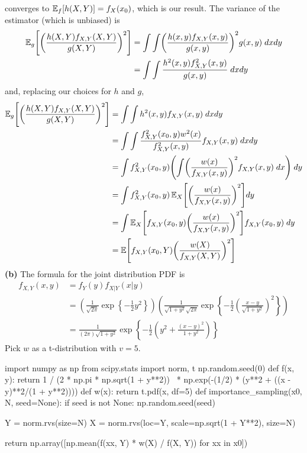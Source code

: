 converges to \(\operatorname{\mathbb{E}}_f[h(X, Y)] = f_X(x_{0})\), which is our result.
The variance of the estimator (which is unbiased) is
\begin{align*}
\EXP_g\left[ \left(\frac{h(X, Y) f_{X, Y}(X, Y)}{g(X, Y)} \right)^{2} \right]
&= \int \int \left( \frac{h(x, y) f_{X, Y}(x, y)}{g(x, y)} \right)^{2} g(x, y) \; dx dy \\
&= \int \int \frac{h^{2}(x, y) f_{X, Y}^{2}(x, y)}{g(x, y)} \; dx dy
\end{align*}
and, replacing our choices for \(h\) and \(g\),
\begin{align*}
\EXP_g\left[ \left(\frac{h(X, Y) f_{X, Y}(X, Y)}{g(X, Y)} \right)^{2} \right]
&= \int \int h^{2}(x, y) f_{X, Y}(x, y) \; dx dy \\
&= \int \int \frac{f_{X, Y}^{2}(x_{0}, y) w^{2}(x) }{ f_{X, Y}^{2}(x, y) } f_{X, Y}(x, y) \; dx dy \\
&= \int f_{X, Y}^{2}(x_{0}, y) \left( \int \left(\frac{w(x)}{f_{X, Y}(x, y)}\right)^{2} f_{X, Y}(x, y) \; dx \right) \; dy \\
&= \int f_{X, Y}^{2}(x_{0}, y) \EXP_X\left[ \left(\frac{w(x)}{f_{X, Y}(x, y)}\right)^{2} \right] dy \\
&= \int \EXP_X\left[ f_{X, Y}(x_{0}, y) \left(\frac{w(x)}{f_{X, Y}(x, y)}\right)^{2} \right] f_{X, Y}(x_{0}, y) \; dy \\
&= \EXP \left[  f_{X, Y}(x_{0}, Y) \left(\frac{w(X)}{f_{X, Y}(X, Y)}\right)^{2} \right]
\end{align*}
\textbf{(b)} The formula for the joint distribution PDF is
\begin{align*}
f_{X, Y}(x, y) &= f_Y(y) f_{X | Y}(x | y) \\
&= \left( \frac{1}{\sqrt{2 \pi}} \exp \left\{ -\frac{1}{2} y^{2} \right\} \right)
\left( \frac{1}{\sqrt{1 + y^{2}} \sqrt{2 \pi}} \exp \left\{ -\frac{1}{2} \left( \frac{x - y}{\sqrt{1 + y^{2}}} \right)^{2}\right\} \right) \\
&= \frac{1}{(2 \pi) \sqrt{1 + y^{2}}} \exp \left\{ -\frac{1}{2} \left( y^{2} + \frac{(x - y)^{2}}{1 + y^{2}} \right) \right\}
\end{align*}
Pick \(w\) as a t-distribution with \(v = 5\).

\begin{python}
import numpy as np
from scipy.stats import norm, t
np.random.seed(0)
def f(x, y):
    return 1 / (2 * np.pi * np.sqrt(1 + y**2)) \ 
           * np.exp(-(1/2) * (y**2 + ((x - y)**2/(1 + y**2))))
def w(x):
    return t.pdf(x, df=5)
def importance_sampling(x0, N, seed=None):
    if seed is not None:
        np.random.seed(seed)
        
    Y = norm.rvs(size=N)
    X = norm.rvs(loc=Y, scale=np.sqrt(1 + Y**2), size=N)
    
    return np.array([np.mean(f(xx, Y) * w(X) / f(X, Y)) for xx in x0])
\end{python}

